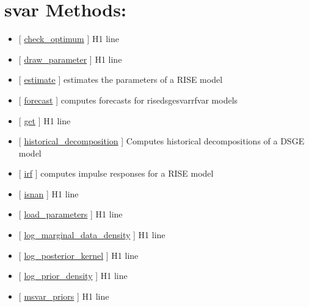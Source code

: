 \documentclass[letterpaper,10pt,english]{sphinxmanual}
\begin{document}
\section{svar Methods:}
\label{classes/models/@svar/svar:svar-methods}\begin{itemize}
\item {} 
{[} {\hyperref[classes/models/@svar/svar:check-optimum]{check\_optimum}} {]}   H1 line

\item {} 
{[} {\hyperref[classes/models/@svar/svar:draw-parameter]{draw\_parameter}} {]}   H1 line

\item {} 
{[} {\hyperref[classes/models/@svar/svar:estimate]{estimate}} {]}  estimates the parameters of a RISE model

\item {} 
{[} {\hyperref[classes/models/@svar/svar:forecast]{forecast}} {]}  computes forecasts for rise\textbar{}dsge\textbar{}svar\textbar{}rfvar models

\item {} 
{[} {\hyperref[classes/models/@svar/svar:get]{get}} {]}   H1 line

\item {} 
{[} {\hyperref[classes/models/@svar/svar:historical-decomposition]{historical\_decomposition}} {]} Computes historical decompositions of a DSGE model

\item {} 
{[} {\hyperref[classes/models/@svar/svar:irf]{irf}} {]}  computes impulse responses for a RISE model

\item {} 
{[} {\hyperref[classes/models/@svar/svar:isnan]{isnan}} {]}   H1 line

\item {} 
{[} {\hyperref[classes/models/@svar/svar:load-parameters]{load\_parameters}} {]}   H1 line

\item {} 
{[} {\hyperref[classes/models/@svar/svar:log-marginal-data-density]{log\_marginal\_data\_density}} {]}   H1 line

\item {} 
{[} {\hyperref[classes/models/@svar/svar:log-posterior-kernel]{log\_posterior\_kernel}} {]}   H1 line

\item {} 
{[} {\hyperref[classes/models/@svar/svar:log-prior-density]{log\_prior\_density}} {]}   H1 line

\item {} 
{[} {\hyperref[classes/models/@svar/svar:msvar-priors]{msvar\_priors}} {]}   H1 line


\end{itemize}
\end{document}
